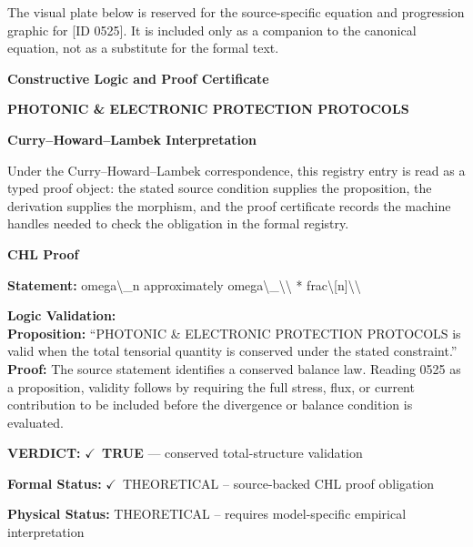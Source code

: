 \begingroup\footnotesize\sloppy
The visual plate below is reserved for the source-specific equation and progression graphic for [ID 0525]. It is included only as a companion to the canonical equation, not as a substitute for the formal text.
\par\endgroup
\ifTZPDarkEdition
{}
\fi

\clearpage
\begingroup\tzpsupportsetup
\noindent\textbf{\fontsize{10.8pt}{12.8pt}\selectfont [ID 0525] Constructive Logic and Proof Certificate}\par
\noindent\textbf{\fontsize{10pt}{12pt}\selectfont PHOTONIC \& ELECTRONIC PROTECTION PROTOCOLS}\par
\vspace{0.45em}
\begingroup
\footnotesize
\setlength{\parskip}{0.22em}
\setlength{\parindent}{0pt}
\noindent\textbf{Curry--Howard--Lambek Interpretation}\par
Under the Curry--Howard--Lambek correspondence, this registry entry is read as a typed proof
object: the stated source condition supplies the proposition, the derivation supplies the
morphism, and the proof certificate records the machine handles needed to check the obligation
in the formal registry.

\vspace{0.45em}
\noindent\textbf{CHL Proof}\par
\textbf{Statement:} omega\textbackslash{}\_n approximately omega\textbackslash{}\_\textbackslash{}\textbackslash{} * frac\textbackslash{}[n]\textbackslash{}\textbackslash{}

\textbf{Logic Validation:}\\
\textbf{Proposition:} ``PHOTONIC \& ELECTRONIC PROTECTION PROTOCOLS is valid when the total tensorial quantity is
conserved under the stated constraint.''\\
\textbf{Proof:} The source statement identifies a conserved balance law. Reading 0525 as a proposition,
validity follows by requiring the full stress, flux, or current contribution to be
included before the divergence or balance condition is evaluated.

\textbf{VERDICT:} \ensuremath{\checkmark}\ \textbf{TRUE} --- conserved total-structure validation

\textbf{Formal Status:} \ensuremath{\checkmark}\ THEORETICAL -- source-backed CHL proof obligation

\textbf{Physical Status:} THEORETICAL -- requires model-specific empirical interpretation
\par\vspace{0.45em}
\par
\ifTZPDarkEdition
{}
\fi
\endgroup
\endgroup
